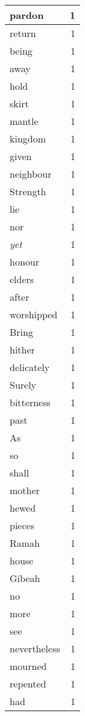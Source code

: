 \begin{center}
\begin{longtable}{l|r}
pardon & 1 \\ \hline
return & 1 \\ \hline
being & 1 \\ \hline
away & 1 \\ \hline
hold & 1 \\ \hline
skirt & 1 \\ \hline
mantle & 1 \\ \hline
kingdom & 1 \\ \hline
given & 1 \\ \hline
neighbour & 1 \\ \hline
Strength & 1 \\ \hline
lie & 1 \\ \hline
nor & 1 \\ \hline
\emph{yet} & 1 \\ \hline
honour & 1 \\ \hline
elders & 1 \\ \hline
after & 1 \\ \hline
worshipped & 1 \\ \hline
Bring & 1 \\ \hline
hither & 1 \\ \hline
delicately & 1 \\ \hline
Surely & 1 \\ \hline
bitterness & 1 \\ \hline
past & 1 \\ \hline
As & 1 \\ \hline
so & 1 \\ \hline
shall & 1 \\ \hline
mother & 1 \\ \hline
hewed & 1 \\ \hline
pieces & 1 \\ \hline
Ramah & 1 \\ \hline
house & 1 \\ \hline
Gibeah & 1 \\ \hline
no & 1 \\ \hline
more & 1 \\ \hline
see & 1 \\ \hline
nevertheless & 1 \\ \hline
mourned & 1 \\ \hline
repented & 1 \\ \hline
had & 1 \\ \hline
\end{longtable}
\end{center}



